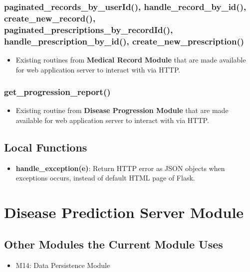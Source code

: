 \documentclass[12pt, titlepage]{article}
\begin{document}
\subsubsection{paginated\_records\_by\_userId(), handle\_record\_by\_id(), create\_new\_record(), paginated\_prescriptions\_by\_recordId(), handle\_prescription\_by\_id(), create\_new\_prescription() }
\begin{itemize}
    \item Existing routines from \textbf{Medical Record Module} that are made available for web application server to interact with via HTTP.
\end{itemize}

\subsubsection{get\_progression\_report()}
\begin{itemize}
    \item Existing routine from \textbf{Disease Progression Module} that are made available for web application server to interact with via HTTP.
\end{itemize}

\subsection{Local Functions}
\begin{itemize}
    \item \textbf{handle\_exception(e)}: Return HTTP error as JSON objects when exceptions occurs, instead of default HTML page of Flask.
\end{itemize}

\section{Disease Prediction Server Module}

\subsection{Other Modules the Current Module Uses}
\begin{itemize}
    \item M14: Data Persistence Module
\end{itemize}
\end{document}
